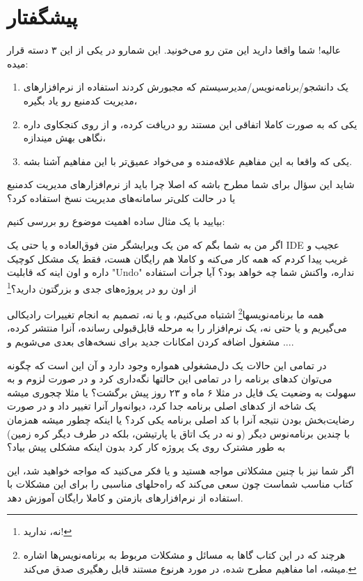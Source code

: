 \chapter{پیشگفتار}
عالیه! شما واقعا دارید این متن رو می‌خونید. این شمارو در یکی از این ۳ دسته قرار میده:
\begin{enumerate}
\item یک دانشجو/برنامه‌نویس/مدیرسیستم که مجبورش کردند استفاده از نرم‌افزارهای مدیریت کدمنبع رو یاد بگیره،
\item یکی که به صورت کاملا اتفاقی این مستند رو دریافت کرده،‌ و از روی کنجکاوی داره نگاهی بهش میندازه،
\item یکی که واقعا به این مفاهیم علاقه‌منده و می‌خواد عمیق‌تر با این مفاهیم آشنا بشه.
\end{enumerate}

شاید این سؤال برای شما مطرح باشه که اصلا چرا باید از نرم‌افزارهای مدیریت کد‌منبع یا در حالت کلی‌تر سامانه‌های مدیریت نسخ استفاده کرد؟

بیایید با یک مثال ساده اهمیت موضوع رو بررسی کنیم:

اگر من به شما بگم که من یک ویرایشگر متن فوق‌العاده و یا حتی یک IDE عجیب و غریب پیدا کردم که همه کار می‌کنه و کاملا هم رایگان هست، فقط یک مشکل کوچیک داره و اون اینه که قابلیت "Undo" نداره، واکنش شما چه خواهد بود؟ آیا جرأت استفاده از اون رو در پروژه‌های جدی و بزرگتون دارید؟\footnote{ نه، ندارید!}

همه ما برنامه‌نویسها\footnote{هرچند که در این کتاب گاها به مسائل و مشکلات مربوط به برنامه‌نویس‌ها اشاره میشه، اما مفاهیم مطرح شده، در مورد هرنوع مستند قابل رهگیری صدق می‌کند.} اشتباه می‌کنیم، و یا نه، تصمیم به انجام تغییرات رادیکالی می‌گیریم و یا حتی نه، یک نرم‌افزار را به مرحله قابل‌قبولی رسانده، آنرا منتشر کرده، مشغول اضافه کردن امکانات جدید برای نسخه‌های بعدی می‌شویم و ....

در تمامی این حالات یک دل‌مشغولی همواره وجود دارد و آن این است که چگونه می‌توان کدهای برنامه را در تمامی این حالتها نگه‌داری کرد و در صورت لزوم و به سهولت به وضعیت یک فایل در مثلا ۶ ماه و ۲۳ روز پیش برگشت؟ یا مثلا چجوری میشه یک شاخه از کدهای اصلی برنامه جدا کرد، دیوانه‌وار آنرا تغییر داد و در صورت رضایت‌بخش بودن نتیجه آنرا با کد اصلی برنامه یکی کرد؟ یا اینکه چطور میشه همزمان با چندین برنامه‌نوس دیگر (و نه در یک اتاق یا پارتیشن، بلکه در طرف دیگر کره زمین) به طور مشترک روی یک پروژه کار کرد بدون اینکه مشکلی پیش بیاد؟

اگر شما نیز با چنین مشکلاتی مواجه هستید و یا فکر می‌کنید که مواجه خواهید شد، این کتاب مناسب شماست چون سعی می‌کند که راه‌حلهای مناسبی را برای این مشکلات با استفاده از نرم‌افزارهای بازمتن و کاملا رایگان آموزش دهد.

